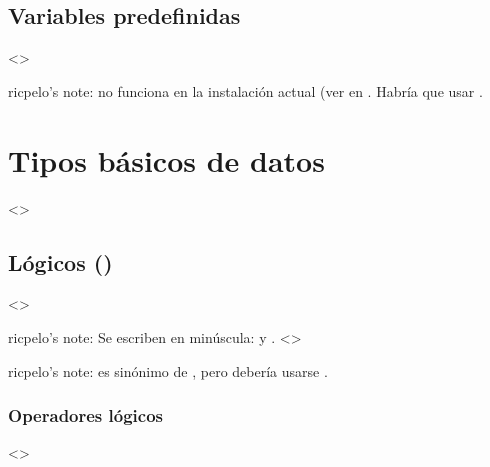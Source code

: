\documentclass[a4paper,12pt,spanish]{sphinxmanual}
\begin{document}
\subsection{Variables predefinidas}
\label{\detokenize{php:variables-predefinidas}}
\textless{}\textgreater{}

ricpelo’s note:  no funciona en la instalación actual (ver
 en . Habría que usar .


\section{Tipos básicos de datos}
\label{\detokenize{php:tipos-basicos-de-datos}}
\textless{}\textgreater{}


\subsection{Lógicos ()}
\label{\detokenize{php:logicos-bool}}
\textless{}\textgreater{}

\begin{DUlineblock}{0em}
\item[] ricpelo’s note: Se escriben en minúscula:  y
. \textless{}\textgreater{}
\item[] ricpelo’s note:  es sinónimo de , pero debería
usarse .
\end{DUlineblock}


\subsubsection{Operadores lógicos}
\label{\detokenize{php:operadores-logicos}}
\textless{}\textgreater{}
\end{document}
